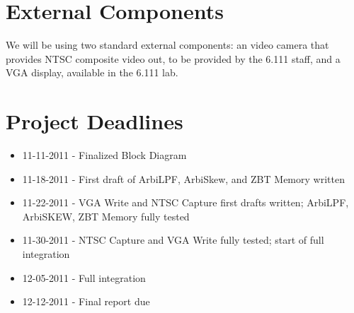 \documentclass[10pt]{article}
\begin{document}
\section{External Components}
We will be using two standard external components: an video camera that provides NTSC composite video out, to be provided by the 6.111 staff, and a VGA display, available in the 6.111 lab.

\section{Project Deadlines}
\begin{itemize}
\item 11-11-2011 - Finalized Block Diagram
\item 11-18-2011 - First draft of ArbiLPF, ArbiSkew, and ZBT Memory written
\item 11-22-2011 - VGA Write and NTSC Capture first drafts written; ArbiLPF, ArbiSKEW, ZBT Memory fully tested
\item 11-30-2011 - NTSC Capture and VGA Write fully tested; start of full integration
\item 12-05-2011 - Full integration
\item 12-12-2011 - Final report due
\end{itemize}
\end{document}
